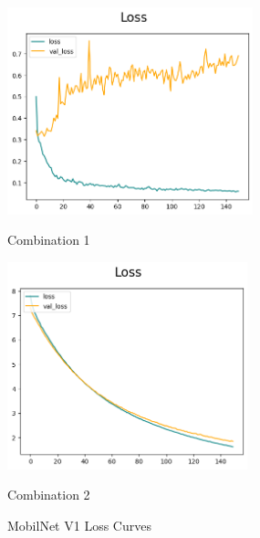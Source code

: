 \begin{figure}[H]
    \centering
    \begin{minipage}[b]{0.49\textwidth}
        \centering
        \includegraphics[width=\textwidth, height=6cm]{Figures/balanced_data/less_data/withoutbn/mn1/loss.png}
        \captionsetup{labelformat=empty}
        \caption{Combination 1}
        \label{fig:u_wo_r_l}
    \end{minipage}
    \hfill
    \begin{minipage}[b]{0.49\textwidth}
        \centering
        \includegraphics[width=\textwidth, height=6cm]{Figures/balanced_data/less_data/withbn/mn1/loss.png}
        \captionsetup{labelformat=empty}
        \caption{Combination 2}
        \label{fig:u_w_r_l}
    \end{minipage}
    \captionsetup{labelformat=default}
    \caption{MobilNet V1 Loss Curves}
\end{figure}

